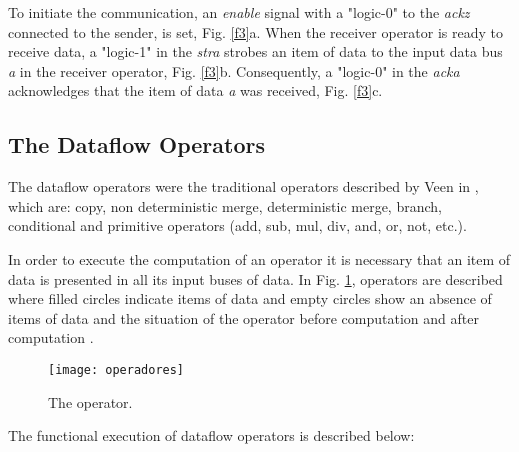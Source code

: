 \documentclass[preprint,12pt]{elsarticle}
\begin{document}
To initiate the communication, an {\it enable} signal with a "logic-0" to the  {\it ackz} connected to the sender, is set, Fig. \ref{f3}a. When the receiver operator is ready to receive data, a "logic-1" in the {\it stra} strobes an item of data to the input data bus {\it a} in the receiver operator, Fig. \ref{f3}b. Consequently, a "logic-0" in the {\it acka} acknowledges that the item of data {\it a} was received, Fig. \ref{f3}c.

\subsection{The Dataflow Operators}

The dataflow operators were the traditional operators described by Veen in \cite{r72}, which are: copy, non deterministic merge, deterministic merge, branch, conditional and primitive operators (add, sub, mul, div, and, or, not, etc.).

In order to execute the computation of an operator it is necessary that an item of data is presented in all its input buses of data. In Fig. \ref{f4}, operators are described where filled circles indicate items of data and empty circles show an absence of items of data and the situation of the operator before computation and after computation \cite{r82}.

\begin{figure}[h]
\begin{center}
   \texttt{[image: operadores]}
   \caption{The operator. \cite{r82}} \label{f4}
\end{center}
\end{figure}

The functional execution of dataflow operators is described below:
\end{document}

